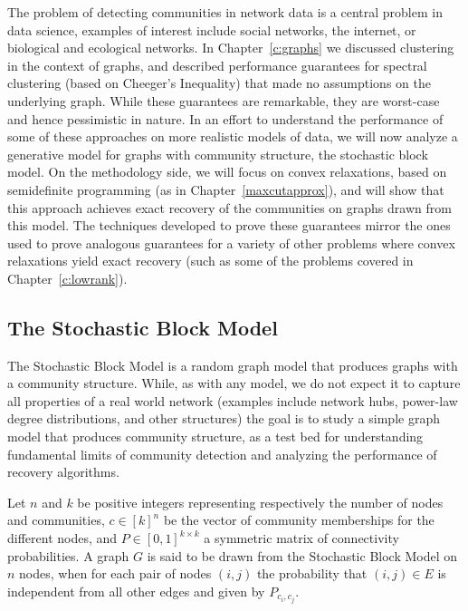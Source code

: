The problem of detecting communities in network data is a central problem in data science, examples of interest include social networks, the internet, or biological and ecological networks. In Chapter~\ref{c:graphs} we discussed clustering in the context of graphs, and described performance guarantees for spectral clustering (based on Cheeger's Inequality) that made no assumptions on the underlying graph. While these guarantees are remarkable, they are worst-case and hence pessimistic in nature. In an effort to understand the performance of some of these approaches on more realistic models of data, we will now analyze a generative model for graphs with community structure, the stochastic block model. On the methodology side, we will focus on convex relaxations, based on semidefinite programming (as in Chapter~\ref{maxcutapprox}), and will show that this approach achieves exact recovery of the communities on graphs drawn from this model. The techniques developed to prove these guarantees mirror the ones used to prove analogous guarantees for a variety of other problems where convex relaxations yield exact recovery (such as some of the problems covered in Chapter~\ref{c:lowrank}).



\subsection{The Stochastic Block Model}

The Stochastic Block Model is a random graph model that produces graphs with a community structure. While, as with any model, we do not expect it to capture all properties of a real world network (examples include network hubs, power-law degree distributions, and other structures) the goal is to study a simple graph model that produces community structure, as a test bed for understanding fundamental limits of community detection and analyzing the performance of recovery algorithms. 

\begin{definition}
Let $n$ and $k$ be positive integers representing respectively the number of nodes and communities, $c\in [k]^n$ be the vector of community memberships for the different nodes, and $P\in [0,1]^{k\times k}$ a symmetric matrix of connectivity probabilities. A graph $G$ is said to be drawn from the Stochastic Block Model on $n$ nodes, when for each pair of nodes $(i,j)$ the probability that $(i,j)\in E$ is independent from all other edges and given by $P_{c_i,c_j}$.
\end{definition}

